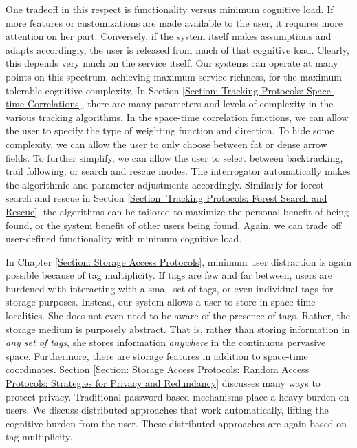 One tradeoff in this respect is functionality versus minimum cognitive load. If more features or customizations are made available to the user, it requires more attention on her part. Conversely, if the system itself makes assumptions and adapts accordingly, the user is released from much of that cognitive load. Clearly, this depends very much on the service itself. Our systems can operate at many points on this spectrum, achieving maximum service richness, for the maximum tolerable cognitive complexity. In Section \ref{Section: Tracking Protocols: Space-time Correlations}, there are many parameters and levels of complexity in the various tracking algorithms. In the space-time correlation functions, we can allow the user to specify the type of weighting function and direction. To hide some complexity, we can allow the user to only choose between fat or dense arrow fields. To further simplify, we can allow the user to select between backtracking, trail following, or search and rescue modes. The interrogator automatically makes the algorithmic and parameter adjustments accordingly. Similarly for forest search and rescue in Section \ref{Section: Tracking Protocols: Forest Search and Rescue}, the algorithms can be tailored to maximize the personal benefit of being found, or the system benefit of other users being found. Again, we can trade off user-defined functionality with minimum cognitive load.

In Chapter \ref{Section: Storage Access Protocols}, minimum user distraction is again possible because of tag multiplicity. If tags are few and far between, users are burdened with interacting with a small set of tags, or even individual tags for storage purposes. Instead, our system allows a user to store in space-time localities. She does not even need to be aware of the presence of tags. Rather, the storage medium is purposely abstract. That is, rather than storing information in \emph{any set of tags}, she stores information \emph{anywhere} in the continuous pervasive space. Furthermore, there are storage features in addition to space-time coordinates. Section \ref{Section: Storage Access Protocols: Random Access Protocols: Strategies for Privacy and Redundancy} discusses many ways to protect privacy. Traditional password-based mechanisms place a heavy burden on users. We discuss distributed approaches that work automatically, lifting the cognitive burden from the user. These distributed approaches are again based on tag-multiplicity.

